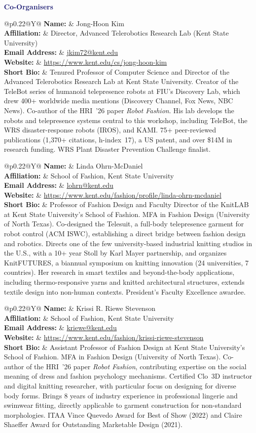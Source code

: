 \documentclass[12pt,letterpaper]{article}
\makeatletter
\newcommand{\FormField}[2]{\textbf{#1} & #2\\}
\newcommand{\FormSection}[1]{\par\vspace{0.75\baselineskip}\noindent{\color{MidnightBlue}\rule{\textwidth}{0.4pt}}\par\vspace{2pt}\noindent\textbf{\textcolor{MidnightBlue}{#1}}\par}
\newcommand{\FormBlockSep}{\par\vspace{0.5\baselineskip}}
\newcommand{\CoOrganizerBlock}[6]{%
  \begingroup
  \renewcommand{\arraystretch}{1.15}%
  \begin{tabularx}{\textwidth}{@{}p{0.22\textwidth}@{\hspace{1em}}Y@{}}
    \FormField{Name:}{#1}
    \FormField{Affiliation:}{#2}
    \FormField{Email Address:}{#4}
    \FormField{Website:}{#5}
    \FormField{Short Bio:}{#6}
  \end{tabularx}
  \endgroup
}
\makeatother
\begin{document}
\pagebreak
\FormSection{Co-Organisers}
\CoOrganizerBlock
  {Jong-Hoon Kim}
  {Director, Advanced Telerobotics Research Lab (Kent State University)}
  {+1 330-672-9060}
  {\href{mailto:jkim72@kent.edu}{jkim72@kent.edu}}
  {\url{https://www.kent.edu/cs/jong-hoon-kim}}
  {Tenured Professor of Computer Science and Director of the Advanced Telerobotics Research Lab at Kent State University. Creator of the TeleBot series of humanoid telepresence robots at FIU's Discovery Lab, which drew 400+ worldwide media mentions (Discovery Channel, Fox News, NBC News). Co-author of the HRI~'26 paper \textit{Robot Fashion}. His lab develops the robots and telepresence systems central to this workshop, including TeleBot, the WRS disaster-response robots (IROS), and KAMI. 75+ peer-reviewed publications (1,370+ citations, h-index~17), a US patent, and over \$14M in research funding. WRS Plant Disaster Prevention Challenge finalist.}
\FormBlockSep
\CoOrganizerBlock
  {Linda Ohrn-McDaniel}
  {School of Fashion, Kent State University}
  {+1 330-672-0188}
  {\href{mailto:lohrn@kent.edu}{lohrn@kent.edu}}
  {\url{https://www.kent.edu/fashion/profile/linda-ohrn-mcdaniel}}
  {Professor of Fashion Design and Faculty Director of the KnitLAB at Kent State University's School of Fashion. MFA in Fashion Design (University of North Texas). Co-designed the Telesuit, a full-body telepresence garment for robot control (ACM ISWC), establishing a direct bridge between fashion design and robotics. Directs one of the few university-based industrial knitting studios in the U.S., with a 10+ year Stoll by Karl Mayer partnership, and organizes KnitFUTURES, a biannual symposium on knitting innovation (24 universities, 7 countries). Her research in smart textiles and beyond-the-body applications, including thermo-responsive yarns and knitted architectural structures, extends textile design into non-human contexts. President's Faculty Excellence awardee.}
\FormBlockSep
\CoOrganizerBlock
  {Krissi R. Riewe Stevenson}
  {School of Fashion, Kent State University}
  {+1 330-672-2735}
  {\href{mailto:kriewe@kent.edu}{kriewe@kent.edu}}
  {\url{https://www.kent.edu/fashion/krissi-riewe-stevenson}}
  {Assistant Professor of Fashion Design at Kent State University's School of Fashion. MFA in Fashion Design (University of North Texas). Co-author of the HRI~'26 paper \textit{Robot Fashion}, contributing expertise on the social meaning of dress and fashion psychology mechanisms. Certified Clo~3D instructor and digital knitting researcher, with particular focus on designing for diverse body forms. Brings 8 years of industry experience in professional lingerie and swimwear fitting, directly applicable to garment construction for non-standard morphologies. ITAA Vince Quevedo Award for Best of Show (2022) and Claire Shaeffer Award for Outstanding Marketable Design (2021).}
\end{document}
